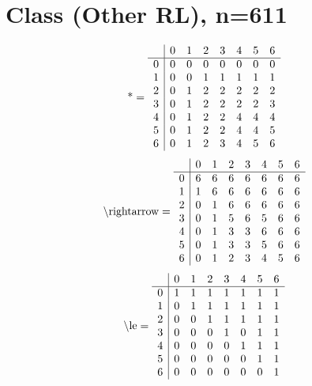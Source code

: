 \documentclass[11pt]{article}
\begin{document}
\section{Class (Other RL), n=611}
\[\text{*} = 
\begin{array}{r | r r r r r r r}
 & 0 & 1 & 2 & 3 & 4 & 5 & 6 \\ \hline
0 & 0 & 0 & 0 & 0 & 0 & 0 & 0 \\
1 & 0 & 0 & 1 & 1 & 1 & 1 & 1 \\
2 & 0 & 1 & 2 & 2 & 2 & 2 & 2 \\
3 & 0 & 1 & 2 & 2 & 2 & 2 & 3 \\
4 & 0 & 1 & 2 & 2 & 4 & 4 & 4 \\
5 & 0 & 1 & 2 & 2 & 4 & 4 & 5 \\
6 & 0 & 1 & 2 & 3 & 4 & 5 & 6 \\
\end{array}
\]
\[\text{\textbackslash rightarrow} = 
\begin{array}{r | r r r r r r r}
 & 0 & 1 & 2 & 3 & 4 & 5 & 6 \\ \hline
0 & 6 & 6 & 6 & 6 & 6 & 6 & 6 \\
1 & 1 & 6 & 6 & 6 & 6 & 6 & 6 \\
2 & 0 & 1 & 6 & 6 & 6 & 6 & 6 \\
3 & 0 & 1 & 5 & 6 & 5 & 6 & 6 \\
4 & 0 & 1 & 3 & 3 & 6 & 6 & 6 \\
5 & 0 & 1 & 3 & 3 & 5 & 6 & 6 \\
6 & 0 & 1 & 2 & 3 & 4 & 5 & 6 \\
\end{array}
\]
\[\text{\textbackslash le} = 
\begin{array}{r | r r r r r r r}
 & 0 & 1 & 2 & 3 & 4 & 5 & 6 \\ \hline
0 & 1 & 1 & 1 & 1 & 1 & 1 & 1 \\
1 & 0 & 1 & 1 & 1 & 1 & 1 & 1 \\
2 & 0 & 0 & 1 & 1 & 1 & 1 & 1 \\
3 & 0 & 0 & 0 & 1 & 0 & 1 & 1 \\
4 & 0 & 0 & 0 & 0 & 1 & 1 & 1 \\
5 & 0 & 0 & 0 & 0 & 0 & 1 & 1 \\
6 & 0 & 0 & 0 & 0 & 0 & 0 & 1 \\
\end{array}
\]
\end{document}
